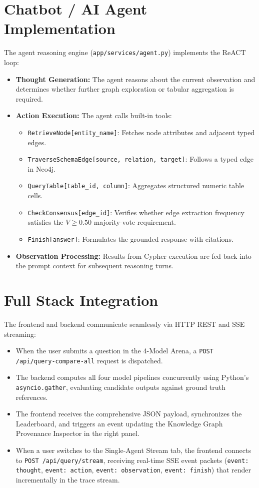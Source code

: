 \documentclass[12pt,a4paper,oneside]{report}
\begin{document}
\section{Chatbot / AI Agent Implementation}
The agent reasoning engine (\texttt{app/services/agent.py}) implements the ReACT loop:
\begin{itemize}
    \item \textbf{Thought Generation:} The agent reasons about the current observation and determines whether further graph exploration or tabular aggregation is required.
    \item \textbf{Action Execution:} The agent calls built-in tools:
    \begin{itemize}
        \item \texttt{RetrieveNode[entity\_name]}: Fetches node attributes and adjacent typed edges.
        \item \texttt{TraverseSchemaEdge[source, relation, target]}: Follows a typed edge in Neo4j.
        \item \texttt{QueryTable[table\_id, column]}: Aggregates structured numeric table cells.
        \item \texttt{CheckConsensus[edge\_id]}: Verifies whether edge extraction frequency satisfies the $V \ge 0.50$ majority-vote requirement.
        \item \texttt{Finish[answer]}: Formulates the grounded response with citations.
    \end{itemize}
    \item \textbf{Observation Processing:} Results from Cypher execution are fed back into the prompt context for subsequent reasoning turns.
\end{itemize}

\section{Full Stack Integration}
The frontend and backend communicate seamlessly via HTTP REST and SSE streaming:
\begin{itemize}
    \item When the user submits a question in the 4-Model Arena, a \texttt{POST /api/query-compare-all} request is dispatched.
    \item The backend computes all four model pipelines concurrently using Python's \texttt{asyncio.gather}, evaluating candidate outputs against ground truth references.
    \item The frontend receives the comprehensive JSON payload, synchronizes the Leaderboard, and triggers an event updating the Knowledge Graph Provenance Inspector in the right panel.
    \item When a user switches to the Single-Agent Stream tab, the frontend connects to \texttt{POST /api/query/stream}, receiving real-time SSE event packets (\texttt{event: thought}, \texttt{event: action}, \texttt{event: observation}, \texttt{event: finish}) that render incrementally in the trace stream.
\end{itemize}
\end{document}
